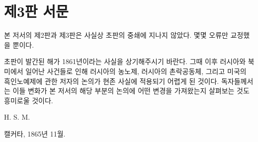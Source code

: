 \chapter*{제3판 서문}

본 저서의 제2판과 제3판은
사실상 초판의 중쇄에 지나지 않았다.
몇몇 오류만 교정했을 뿐이다.

초판이 발간된 해가 1861년이라는 사실을 상기해주시기 바란다.
그때 이후 러시아와 북미에서 일어난 사건들로 인해
러시아의 농노제, 러시아의 촌락공동체,
그리고 미국의 흑인노예제에 관한 저자의 논의가
현존 사실에 적용되기 어렵게 된 것이다.
독자들께서는
이들 변화가 본 저서의 해당 부분의 논의에 어떤 변경을 가져왔는지
살펴보는 것도 흥미로울 것이다.

\begin{flushright}
H. S. M.
\end{flushright}

\begin{footnotesize}
캘커타, 1865년 11월.
\end{footnotesize}

